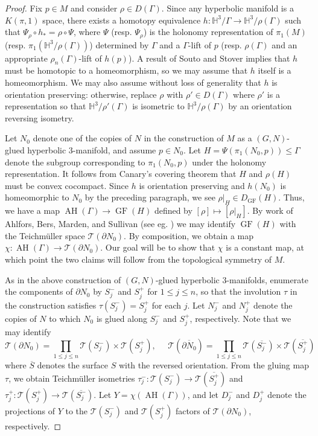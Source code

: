 \documentclass[11pt,leqno]{article}
\DeclareMathOperator{\AH}{AH}
\DeclareMathOperator{\GF}{GF}
\theoremstyle{introdef}
\numberwithin{lemma}{section}
\theoremstyle{definition}
\begin{document}
\begin{proof}
    Fix $p\in M$ and consider $\rho\in D(\Gamma)$. Since any hyperbolic manifold is a $K(\pi,1)$ space, there exists a homotopy equivalence $h:\mathbb{H}^3/\Gamma\rightarrow\mathbb{H}^3/\rho(\Gamma)$ such that $\Psi_\rho\circ h_*=\rho\circ \Psi$, where $\Psi$ (resp. $\Psi_\rho$) is the holonomy representation of $\pi_1(M)$ (resp. $\pi_1(\mathbb{H}^3/\rho(\Gamma))$) determined by $\Gamma$ and a $\Gamma$-lift of $p$ (resp. $\rho(\Gamma)$ and an appropriate $\rho_n(\Gamma)$-lift of $h(p)$). A result of Souto and Stover \cite[Lemma 3.3]{SOUSTO} implies that $h$ must be homotopic to a homeomorphism, so we may assume that $h$ itself is a homeomorphism. We may also assume without loss of generality that $h$ is orientation preserving: otherwise, replace $\rho$ with $\rho'\in D(\Gamma)$ where $\rho'$ is a representation so that $\mathbb{H}^3/\rho'(\Gamma)$ is isometric to $\mathbb{H}^3/\rho(\Gamma)$ by an orientation reversing isometry.\par

    Let $N_0$ denote one of the copies of $N$ in the construction of $M$ as a $(G,N)$-glued hyperbolic $3$-manifold, and assume $p\in N_0$. Let $H=\Psi(\pi_1(N_0,p))\leq\Gamma$ denote the subgroup corresponding to $\pi_1(N_0,p)$ under the holonomy representation. It follows from Canary's covering theorem \cite[Corollary C]{DICKCOVER} that $H$ and $\rho(H)$ must be convex cocompact. Since $h$ is orientation preserving and $h(N_0)$ is homeomorphic to $N_0$ by the preceding paragraph, we see $\rho|_H\in D_{\GF}(H)$. Thus, we have a map $\AH(\Gamma)\rightarrow \GF(H)$ defined by $[\rho]\mapsto[\rho|_H]$. By work of Ahlfors, Bers, Marden, and Sullivan (see eg. \cite{MAT}) we may identify $\GF(H)$ with the Teichm\"{u}ller space $\mathcal{T}(\partial N_0)$. By composition, we obtain a map $\chi:\AH(\Gamma)\rightarrow\mathcal{T}(\partial N_0)$. Our goal will be to show that $\chi$ is a constant map, at which point the two claims will follow from the topological symmetry of $M$.\par

     As in the above construction of $(G,N)$-glued hyperbolic $3$-manifolds, enumerate the components of $\partial N_0$ by $S_j^-$ and $S_j^+$ for $1\leq j\leq n$, so that the involution $\tau$ in the construction satisfies $\tau(S_j^-)=S_j^+$ for each $j$. Let $N_j^-$ and $N_j^+$ denote the copies of $N$ to which $N_0$ is glued along $S_j^-$ and $S_j^+$, respectively. Note that we may identify \[\mathcal{T}(\partial N_0)=\prod_{1\leq j\leq n}\mathcal{T}(S_j^-)\times\mathcal{T}(S_j^+),\;\;\;\;\;\mathcal{T}(\overline{\partial N_0})=\prod_{1\leq j\leq n}\mathcal{T}(\overline{S_j^-})\times\mathcal{T}(\overline{S_j^+})\] where $\overline{S}$ denotes the surface $S$ with the reversed orientation. From the gluing map $\tau$, we obtain Teichm\"{u}ller isometries $\tau_j^-:\mathcal{T}(S_j^-)\rightarrow\mathcal{T}(\overline{S_j^+})$ and $\tau_j^+:\mathcal{T}(S_j^+)\rightarrow\mathcal{T}(\overline{S_j^-})$. Let $Y=\chi(\AH(\Gamma))$, and let $D_j^-$ and $D_j^+$ denote the projections of $Y$ to the $\mathcal{T}(S_j^-)$ and $\mathcal{T}(S_j^+)$ factors of $\mathcal{T}(\partial N_0)$, respectively.\par


\end{proof}
\end{document}
